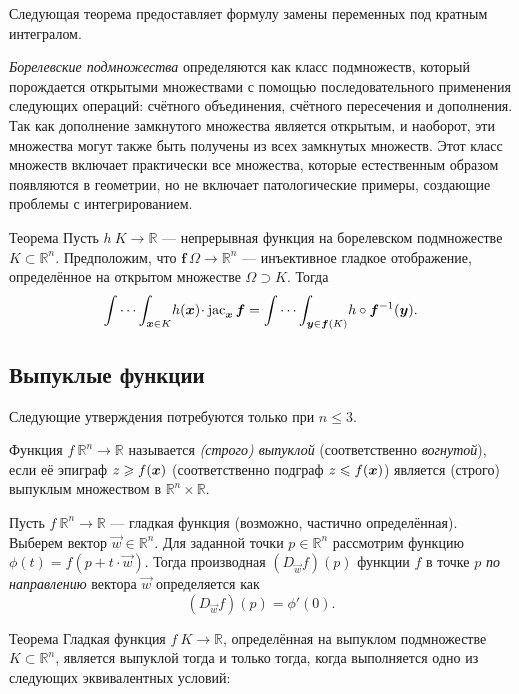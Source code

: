 {Следующая теорема предоставляет формулу замены переменных под кратным интегралом.

\emph{Борелевские подмножества} определяются как класс подмножеств, который порождается открытыми множествами с помощью последовательного применения следующих операций: счётного объединения, счётного пересечения и дополнения.
Так как дополнение замкнутого множества является открытым, и наоборот, эти множества могут также быть получены из всех замкнутых множеств.
Этот класс множеств включает практически все множества, которые естественным образом появляются в геометрии, но не включает патологические примеры, создающие проблемы с интегрированием.

\begin{thm}{Теорема}\label{thm:mult-substitution} 
Пусть $h\:K\to\mathbb{R}$ --- непрерывная функция на борелевском подмножестве $K\subset \mathbb{R}^n$.
Предположим, что $\bm{f}\:\Omega\to \mathbb{R}^n$ --- инъективное гладкое отображение, определённое на открытом множестве $\Omega\supset K$.
Тогда
\[\idotsint_{\bm{x}\in K} \!h(\bm{x})\cdot \jac_{\bm{x}}\bm{f}
=
\idotsint_{\bm{y}\in \bm{f}(K)} \!h\circ \bm{f}^{-1}(\bm{y}).\]

\end{thm}

\subsection*{Выпуклые функции}

Следующие утверждения потребуются только при $n\le 3$.

Функция $f\:\mathbb{R}^n\to \mathbb{R}$ называется \emph{(строго) выпуклой} (соответственно \emph{вогнутой}), если её эпиграф $z\z\ge f(\bm{x})$ (соответственно подграф $z\z\le f(\bm{x})$) является (строго) выпуклым множеством в $\mathbb{R}^n\times \mathbb{R}$.

Пусть $f\:\mathbb{R}^n\to \mathbb{R}$ --- гладкая функция (возможно, частично определённая).
Выберем вектор $\vec w\in \mathbb{R}^n$.
Для заданной точки $p\in\mathbb{R}^n$ рассмотрим функцию $\phi(t)=f(p+t\cdot \vec w)$.
Тогда производная $(D_{\vec w}f)(p)$ функции $f$ в точке $p$ \emph{по направлению} вектора $\vec w$ определяется как
\[(D_{\vec w}f)(p)=\phi'(0).\]

\begin{thm}{Теорема}\label{thm:Jensen}
Гладкая функция $f\:K\to \mathbb{R}$, определённая на выпуклом подмножестве $K\subset\mathbb{R}^n$, является выпуклой тогда и только тогда, когда выполняется одно из следующих эквивалентных условий:


\end{thm}}
